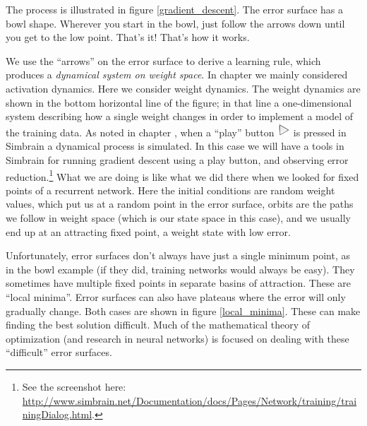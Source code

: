 The process is illustrated in figure \ref{gradient_descent}. The error surface has a bowl shape. Wherever you start in the bowl, just follow the arrows down until you get to the low point. That's it!  That's how it works. 

We use the ``arrows'' on the error surface to derive a learning rule, which produces a \emph{dynamical system on weight space}. In chapter  we mainly considered activation dynamics. Here we consider weight dynamics. The weight dynamics are shown in the bottom horizontal line of the figure; in that line a one-dimensional system describing how a single weight changes in order to implement a model of the training data. As noted in chapter , when a ``play''  button \includegraphics[scale=.5]{./images/Play.png} is pressed in Simbrain  a dynamical process is simulated. In this case we will have a tools in Simbrain for running gradient descent using a play button, and observing error reduction.\footnote{See the screenshot here: \url{http://www.simbrain.net/Documentation/docs/Pages/Network/training/trainingDialog.html}.} What we are doing is like what we did there when we looked for fixed points of a recurrent network. Here the initial conditions are random weight values, which put us at a random point in the error surface, orbits are the paths we follow in weight space (which is our state space in this case), and we usually end up  at an attracting fixed point, a weight state with low error. 

Unfortunately, error surfaces don't always have just a single minimum point, as in the bowl example (if they did, training networks would always be easy). They sometimes have multiple fixed points in separate basins of attraction. These are ``local minima''. Error surfaces can also have plateaus where the error will only gradually change. Both cases are shown in figure \ref{local_minima}. These can make finding the best solution difficult. Much of the mathematical theory of optimization (and  research in neural networks) is focused on dealing with these ``difficult'' error surfaces.

